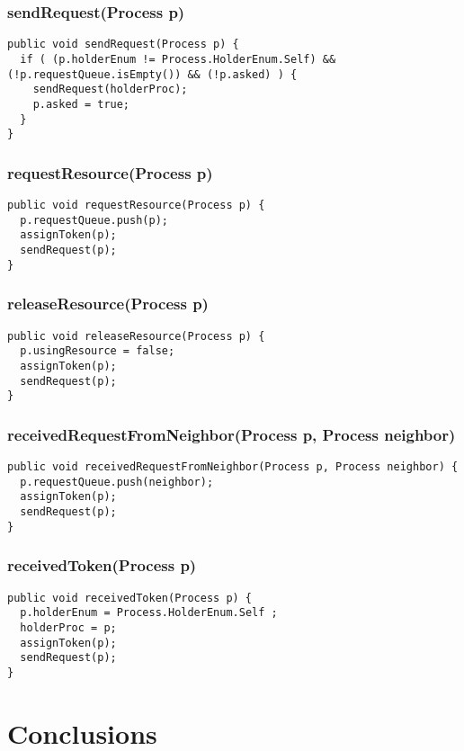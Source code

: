 \documentclass{article}
\begin{document}
\begin{multicols}{2}
		\subsubsection{sendRequest(Process p)}
		\begin{lstlisting}
public void sendRequest(Process p) {
  if ( (p.holderEnum != Process.HolderEnum.Self) && (!p.requestQueue.isEmpty()) && (!p.asked) ) {
    sendRequest(holderProc);
    p.asked = true;
  }
}
		\end{lstlisting}
		\subsubsection{requestResource(Process p)}
		\begin{lstlisting}
public void requestResource(Process p) {
  p.requestQueue.push(p);
  assignToken(p);
  sendRequest(p);
}
		\end{lstlisting}
		
		\subsubsection{releaseResource(Process p)}
		\begin{lstlisting}
public void releaseResource(Process p) {
  p.usingResource = false;
  assignToken(p);
  sendRequest(p);
}
		\end{lstlisting}
		
		\subsubsection{receivedRequestFromNeighbor(Process p, Process neighbor)}
		\begin{lstlisting}
public void receivedRequestFromNeighbor(Process p, Process neighbor) {
  p.requestQueue.push(neighbor);
  assignToken(p);
  sendRequest(p);
}
		\end{lstlisting}
		
		\subsubsection{receivedToken(Process p)}
		\begin{lstlisting}
public void receivedToken(Process p) {
  p.holderEnum = Process.HolderEnum.Self ;
  holderProc = p;
  assignToken(p);
  sendRequest(p);		
}
		\end{lstlisting}
\section{Conclusions}	
\lipsum[42]

\end{multicols}
\end{document}
